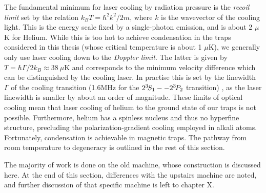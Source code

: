 	The fundamental minimum for laser cooling by radiation pressure is the \emph{recoil limit} set by the relation $k_B T = \hbar^2k^2/2m$, where $k$ is the wavevector of the cooling light.
	This is the energy scale fixed by a single-photon emission, and is about 2 $\mu$K for Helium.
	While this is too hot to achieve condensation in the traps considered in this thesis (whose critical temperature is about 1 $\mu$K), we generally only use laser cooling down to the \emph{Doppler limit}.
	The latter is given by $T = \hbar\Gamma/2 k_B\approx 38~\mu$K and corresponds to the minimum velocity difference which can be distinguished by the cooling laser.
	In practise this is set by the linewidth $\Gamma$ of the cooling transition (1.6MHz for the $2^{3\!} S_1 -- 2^{3\!} P_2$ transition) , as the laser linewidth is smaller by about an order of magnitude\cite{shin16}.
	These limits of optical cooling mean that laser cooling of helium to the ground state of our traps is not possible.
	Furthermore, helium has a spinless nucleus and thus no hyperfine structure, precluding the polarization-gradient cooling employed in alkali atoms.
	Fortunately, condensation is achievable in magnetic traps.
	The pathway from room temperature to degeneracy is outlined in the rest of this section.

	The majority of work is done on the old machine, whose construction is discussed here.
	At the end of this section, differences with the upstairs machine are noted, and further discussion of that specific machine is left to chapter X.


